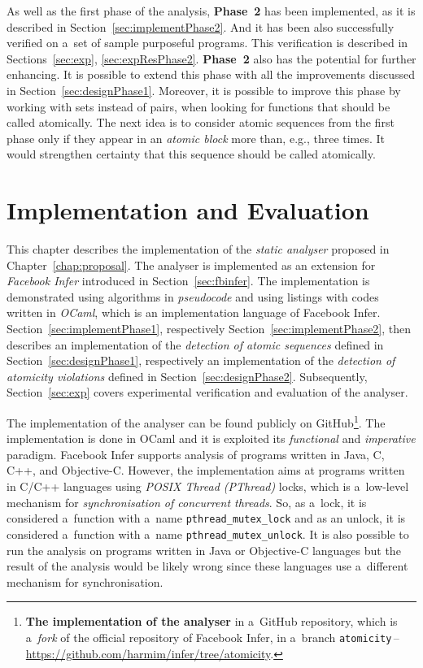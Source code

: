 As well as the first phase of the analysis, \textbf{Phase~2} has been
implemented, as it is described in Section~\ref{sec:implementPhase2}.
And it has been also successfully verified on a~set of sample purposeful
programs. This verification is described in Sections~\ref{sec:exp},
\ref{sec:expResPhase2}. \textbf{Phase~2} also has the potential for
further enhancing. It is possible to extend this phase with all the
improvements discussed in Section~\ref{sec:designPhase1}. Moreover, it
is possible to improve this phase by working with sets instead of pairs,
when looking for functions that should be called atomically. The next idea
is to consider atomic sequences from the first phase only if they appear
in an \emph{atomic block} more than, e.g., three times. It would strengthen
certainty that this sequence should be called atomically.



\chapter{Implementation and Evaluation}
\label{chap:implementExp}

This chapter describes the implementation of the \emph{static analyser}
proposed in Chapter~\ref{chap:proposal}. The analyser is implemented as an
extension for \emph{Facebook Infer} introduced in Section~\ref{sec:fbinfer}.
The implementation is demonstrated using algorithms in \emph{pseudocode}
and using listings with codes written in \emph{OCaml}, which is an
implementation language of Facebook Infer. Section~\ref{sec:implementPhase1},
respectively Section~\ref{sec:implementPhase2}, then describes an
implementation of the \emph{detection of atomic sequences} defined in
Section~\ref{sec:designPhase1}, respectively an implementation of the
\emph{detection of atomicity violations} defined in
Section~\ref{sec:designPhase2}. Subsequently, Section~\ref{sec:exp}
covers experimental verification and evaluation of the analyser.

The implementation of the analyser can be found publicly on
GitHub\footnote{\textbf{The implementation of the analyser} in a~GitHub
repository, which is a~\emph{fork} of the official repository of Facebook
Infer, in a~branch
\texttt{atomicity}\,--\,\url{https://github.com/harmim/infer/tree/atomicity}.}.
The implementation is done in OCaml and it is exploited its \emph{functional}
and \emph{imperative} paradigm. Facebook Infer supports analysis of
programs written in Java, C, C++, and Objective-C. However, the implementation
aims at programs written in C/C++ languages using \emph{POSIX Thread
(PThread)} locks, which is a~low-level mechanism for \emph{synchronisation
of concurrent threads}. So, as a~lock, it is considered a~function with
a~name \texttt{pthread\_mutex\_lock} and as an unlock, it is considered
a~function with a~name \texttt{pthread\_mutex\_unlock}. It is also possible to
run the analysis on programs written in Java or Objective-C languages but
the result of the analysis would be likely wrong since these languages use
a~different mechanism for synchronisation.

